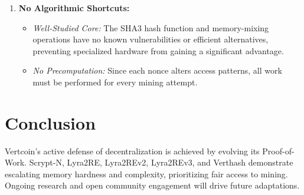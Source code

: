 \documentclass[12pt]{article}
\begin{document}
\begin{enumerate}
    \item \textbf{No Algorithmic Shortcuts:}
    \begin{itemize}
        \item \emph{Well-Studied Core:} The SHA3 hash function and memory-mixing operations have no known vulnerabilities or efficient alternatives, preventing specialized hardware from gaining a significant advantage.
        \item \emph{No Precomputation:} Since each nonce alters access patterns, all work must be performed for every mining attempt.
    \end{itemize}
\end{enumerate}

\section{Conclusion}

Vertcoin’s active defense of decentralization is achieved by evolving its Proof-of-Work. Scrypt-N, Lyra2RE, Lyra2REv2, Lyra2REv3, and Verthash demonstrate escalating memory hardness and complexity, prioritizing fair access to mining. Ongoing research and open community engagement will drive future adaptations.

\newpage
\end{document}
